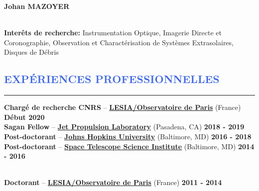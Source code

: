 \documentclass[11pt,a4paper, french]{article}
\begin{document}
\lhead[]{}
\begin{huge}
\noindent\textbf{Johan MAZOYER}
\end{huge}\\

\textbf{Interêts de recherche:} Instrumentation Optique, Imagerie Directe et Coronographie,
Observation et Charactérisation de Systèmes Extrasolaires, Disques de Débris\\





\vspace{-0.8cm}
\textcolor{RoyalBlue}{\section{\large EXPÉRIENCES PROFESSIONNELLES}
\vspace{-0.2cm}\hrule}
\vspace{0.4cm}


\textbf{Chargé de recherche CNRS} --
\href{http://www.obspm.fr}{\textbf{LESIA/Observatoire de Paris}} (France)
\hfill     	 { \bf Début 2020}\\

\vspace{-0.05cm}
\textbf{Sagan Fellow} --
\href{https://www.jpl.nasa.gov/}{\textbf{Jet Propulsion Laboratory}} (Pasadena, CA)
\hfill      { \bf 2018 - 2019}\\

\vspace{-0.05cm}
\textbf{Post-doctorant} --
\href{http://physics-astronomy.jhu.edu/}{\textbf{Johns Hopkins University}} (Baltimore, MD)
\hfill   	 { \bf 2016 - 2018}\\

\vspace{-0.05cm}
\textbf{Post-doctorant} --
\href{http://www.stsci.edu}{\textbf{Space Telescope Science Institute}} (Baltimore, MD)
\hfill        { \bf 2014 - 2016}\\\

\vspace{-0.05cm}
\textbf{Doctorant} --
\href{http://www.obspm.fr/}{\textbf{LESIA/Observatoire de Paris}} (France)
\hfill        { \bf 2011 - 2014}\\
\end{document}
